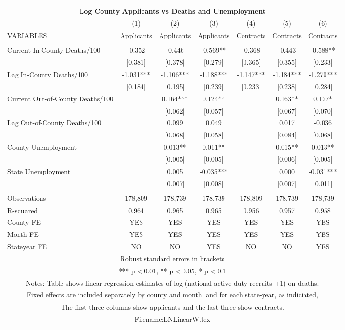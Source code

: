 \documentclass[]{article}
\begin{document}
\begin{tabular}{lcccccc}
\multicolumn{7}{c}{Log County Applicants vs Deaths and Unemployment} \\ \hline
 & (1) & (2) & (3) & (4) & (5) & (6) \\
VARIABLES & Applicants & Applicants & Applicants & Contracts & Contracts & Contracts \\ \hline
 &  &  &  &  &  &  \\
Current In-County Deaths/100 & -0.352 & -0.446 & -0.569** & -0.368 & -0.443 & -0.588** \\
 & [0.381] & [0.378] & [0.279] & [0.365] & [0.355] & [0.233] \\
Lag In-County Deaths/100 & -1.031*** & -1.106*** & -1.188*** & -1.147*** & -1.184*** & -1.270*** \\
 & [0.184] & [0.195] & [0.239] & [0.233] & [0.238] & [0.284] \\
Current Out-of-County Deaths/100 &  & 0.164*** & 0.124** &  & 0.163** & 0.127* \\
 &  & [0.062] & [0.057] &  & [0.067] & [0.070] \\
Lag Out-of-County Deaths/100 &  & 0.099 & 0.049 &  & 0.017 & -0.036 \\
 &  & [0.068] & [0.058] &  & [0.084] & [0.068] \\
County Unemployment &  & 0.013** & 0.011** &  & 0.015** & 0.013** \\
 &  & [0.005] & [0.005] &  & [0.006] & [0.005] \\
State Unemployment &  & 0.005 & -0.035*** &  & 0.000 & -0.031*** \\
 &  & [0.007] & [0.008] &  & [0.007] & [0.011] \\
 &  &  &  &  &  &  \\
Observations & 178,809 & 178,739 & 178,739 & 178,809 & 178,739 & 178,739 \\
R-squared & 0.964 & 0.965 & 0.965 & 0.956 & 0.957 & 0.958 \\
County FE & YES & YES & YES & YES & YES & YES \\
Month FE & YES & YES & YES & YES & YES & YES \\
 Stateyear FE & NO & NO & YES & NO & NO & YES \\ \hline
\multicolumn{7}{c}{ Robust standard errors in brackets} \\
\multicolumn{7}{c}{ *** p$<$0.01, ** p$<$0.05, * p$<$0.1} \\
\multicolumn{7}{c}{ Notes: Table shows linear regression estimates of log (national active duty recruits +1) on deaths.} \\
\multicolumn{7}{c}{ Fixed effects are included separately by county and month, and for each state-year, as indiciated,} \\
\multicolumn{7}{c}{ The first three columns show applicants and the last three show contracts.} \\
\multicolumn{7}{c}{ Filename:LNLinearW.tex} \\
\end{tabular}
\end{document}
